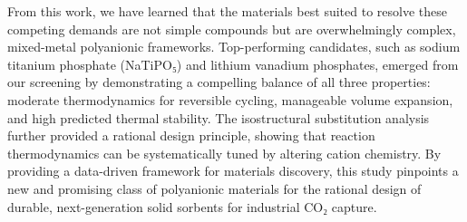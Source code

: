 \documentclass[]{article}
\begin{document}
From this work, we have learned that the materials best suited to resolve these competing demands are not simple compounds but are overwhelmingly complex, mixed-metal polyanionic frameworks. Top-performing candidates, such as sodium titanium phosphate (NaTiPO₅) and lithium vanadium phosphates, emerged from our screening by demonstrating a compelling balance of all three properties: moderate thermodynamics for reversible cycling, manageable volume expansion, and high predicted thermal stability. The isostructural substitution analysis further provided a rational design principle, showing that reaction thermodynamics can be systematically tuned by altering cation chemistry. By providing a data-driven framework for materials discovery, this study pinpoints a new and promising class of polyanionic materials for the rational design of durable, next-generation solid sorbents for industrial CO₂ capture.


{}

\end{document}
